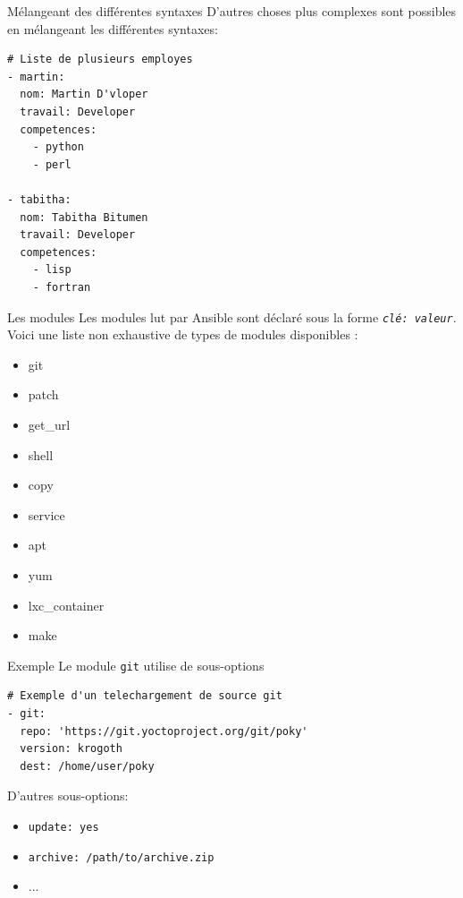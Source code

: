 \documentclass[compress]{smilebeamer}
\begin{document}
\begin{frame}[fragile]{Mélangeant des différentes syntaxes}
D’autres choses plus complexes sont possibles en mélangeant les différentes syntaxes:
\begin{lstlisting}[style=bitbake]
# Liste de plusieurs employes
- martin:
  nom: Martin D'vloper
  travail: Developer
  competences:
    - python
    - perl

- tabitha:
  nom: Tabitha Bitumen
  travail: Developer
  competences:
    - lisp
    - fortran
\end{lstlisting}
\end{frame}


\begin{frame}[fragile]{Les modules}
Les modules lut par Ansible sont déclaré sous la forme \textit{\texttt{clé: valeur}}.\newline
Voici une liste non exhaustive de types de modules disponibles :
\begin{multicols}{2}
\begin{itemize}
	\item git
	\item patch
	\item get\_url
	\item shell
	\item copy
	\item service
	\item apt
	\item yum
	\item lxc\_container
	\item make
\end{itemize}
\end{multicols}
\end{frame}


\begin{frame}[fragile]{Exemple}
Le module \texttt{git} utilise de sous-options
\begin{lstlisting}[style=bitbake]
# Exemple d'un telechargement de source git
- git:
  repo: 'https://git.yoctoproject.org/git/poky'
  version: krogoth
  dest: /home/user/poky
\end{lstlisting}
D'autres sous-options:
\begin{itemize}
	\item \texttt{update: yes}
	\item \texttt{archive: /path/to/archive.zip}
	\item ...
\end{itemize}
\end{frame}
\end{document}
